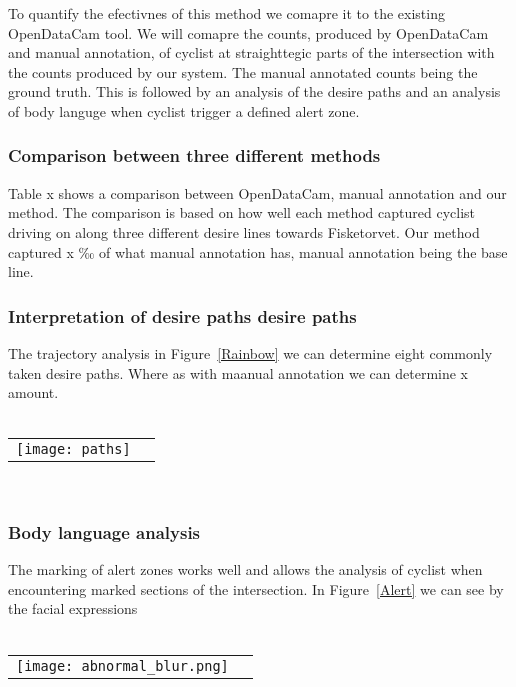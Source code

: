 To quantify the efectivnes of this method we comapre it to the existing OpenDataCam tool.
We will comapre the counts, produced by OpenDataCam and manual annotation, of cyclist at straighttegic parts of the intersection 
with the counts produced by our system.  The manual annotated counts being the ground truth.
This is followed by an analysis of the desire paths and an analysis of body languge when cyclist trigger a defined
alert zone.
\ \\ 

\subsubsection{Comparison between three different methods}
Table x shows a comparison between OpenDataCam, manual annotation and our method.
The comparison is based on how well each method captured cyclist driving on along three different 
desire lines towards Fisketorvet.
Our method captured x ‰ of what manual annotation has, manual annotation being the base line.
\ \\

\subsubsection{Interpretation of desire paths desire paths}
The trajectory analysis in Figure~\ref{Rainbow} we can determine eight commonly taken desire paths. 
Where as with maanual annotation we can determine x amount.
\ \\
\raggedbottom
\ \\ 
\noindent
\begin{tabular}{@{}cc}
\texttt{[image: paths]} 
\end{tabular}
\label{traject}

\ \\
\subsubsection{Body language analysis}
The marking of alert zones works well and allows the analysis of cyclist when encountering marked sections of the 
intersection. In Figure~\ref{Alert} we can see by the facial expressions 
\ \\
\raggedbottom
\ \\ 
\noindent
\begin{tabular}{@{}cc}
\texttt{[image: abnormal\_blur.png]} 
\end{tabular}
\label{Alert}
\ \\

